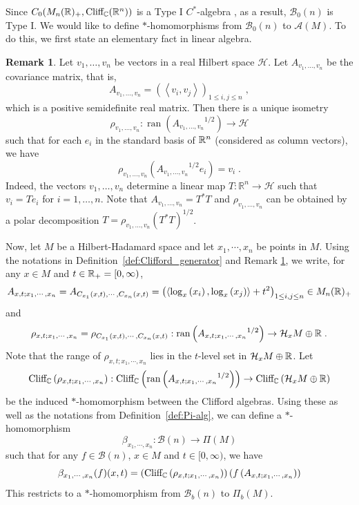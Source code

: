 \documentclass[11pt]{article}
\theoremstyle{definition}
\newtheorem{Rem}[Def]{Remark}
\theoremstyle{plain}
\def\A{\mathcal A}\def\C{\mathcal C}\def\B{\mathcal B}\def\E{\mathcal E}\def\O{\mathcal O}\def\h{\mathfrak h}\def\K{\mathcal K}\def\F{\mathcal F}\def\P{\mathcal P}\def\L{\mathcal L}\def\R{\mathcal R}\def\Q{\mathcal Q}\def\H{\mathcal H}\def\S{\mathcal S}\def\N{\mathcal N}\def\U{\mathcal U}\def\V{\mathcal V}
\def\Cl{\textup{Cliff}_{\IC}}
\begin{document}
Since $C_0(M_n(\IR)_+,\Cl(\IR^n))$ is a Type I $C^*$-algebra \cite{Blackoperator}, as a result, $\B_0(n)$ is Type I. We would like to define $*$-homomorphisms from $\B_0(n)$ to $\A(M)$. To do this, we first state an elementary fact in linear algebra.

\begin{Rem}\label{positive matrix}
Let $v_1, \ldots, v_n$ be vectors in a real Hilbert space $\H$. Let $A_{v_1, \ldots, v_n}$ be the covariance matrix, that is,  
\[A_{v_1, \ldots, v_n} = \left( \left\langle v_i , v_j \right\rangle \right)_{1 \leq i,j \leq n} \; ,\]
which is a positive semidefinite real matrix. Then there is a unique isometry 
\[\rho_{v_1, \ldots, v_n} \colon \operatorname{ran}\left({A_{v_1, \ldots, v_n}}^{1/2}\right) \to \H\]
such that for each $e_i$ in the standard basis of $\mathbb R^n$ (considered as column vectors), we have 
\[\rho_{v_1, \ldots, v_n} \left( {A_{v_1, \ldots, v_n}}^{1/2} e_i \right) = v_i \; .\]
Indeed, the vectors $v_1, \ldots, v_n$ determine a linear map $T \colon \mathbb{R}^n \to \H$ such that $v_i = T e_i$ for $i = 1, \ldots, n$. Note that $A_{v_1, \ldots, v_n} = T^* T$ and $\rho_{v_1, \ldots, v_n}$  can be obtained by a polar decomposition $T = \rho_{v_1, \ldots, v_n} (T^* T)^{1/2}$. 
\end{Rem}

Now, let $M$ be a Hilbert-Hadamard space and let $x_1,\cdots,x_n$ be points in $M$. 
Using the notations in Definition~\ref{def:Clifford_generator} and Remark \ref{positive matrix}, we write, for any $x\in M$ and $t\in\mathbb R_+=[0,\infty)$, 
\[A_{x,t; x_1, \cdots, x_n} = A_{C_{x_1}(x,t), \cdots, C_{x_n}(x,t)} = \left( \left\langle \log_x \left( x_i \right), \log_x \left( x_j \right) \right\rangle + t^2 \right)_{1 \leq i,j \leq n} \in M_n(\mathbb R)_+\]
and 
\[\rho_{x,t; x_1, \cdots, x_n} = \rho_{C_{x_1}(x,t), \cdots, C_{x_n}(x,t)} : \operatorname{ran}\left({A_{x,t; x_1, \cdots, x_n}}^{1/2}\right) \to \H_x M \oplus \IR \; .\]
Note that the range of $\rho_{x,t; x_1, \cdots, x_n}$ lies in the $t$-level set in $\H_xM\oplus\IR$. Let 
\[\Cl\left(\rho_{x,t; x_1, \cdots, x_n}\right): \Cl \left(\operatorname{ran}\left({A_{x,t; x_1, \cdots, x_n}}^{1/2}\right)\right) \to \Cl\left(\H_x M \oplus \IR\right)\]
be the induced $*$-homomorphism between the Clifford algebras. Using these as well as the notations from Definition~\ref{def:Pi-alg}, we can define a $*$-homomorphism 
\[\beta_{x_1, \cdots, x_n} : \B(n) \to \Pi(M)\]
such that for any $f \in \B(n)$, $x \in M$ and $t \in [0,\infty)$, we have
\[\beta_{x_1, \cdots, x_n} (f) (x,t) = \left(\Cl\left(\rho_{x,t; x_1, \cdots, x_n}\right) \right) \left(f\left(A_{x,t; x_1, \cdots, x_n}\right)\right)\]
This restricts to a $*$-homomorphism from $\B_b(n)$ to $\Pi_b(M)$. 
\end{document}
